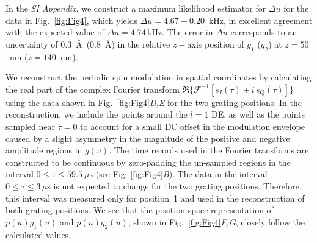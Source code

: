\documentclass[9pt,twocolumn,twoside,lineno]{pnas-new}
\begin{document}
In the \textit{SI Appendix}, we construct a maximum likelihood estimator for $\Delta u$ for the data in Fig.~\ref{fig:Fig4}, which yields $\Delta u = 4.67\pm 0.20$~kHz, in excellent agreement with the expected value of $\Delta u=4.74\,\text{kHz}$. The error in $\Delta u$ corresponds to an uncertainty of 0.3~\AA~(0.8~\AA) in the relative $z-$axis position of $g_1$ ($g_2$) at $z = 50$~nm ($z = 140$~nm).

We reconstruct the periodic spin modulation in spatial coordinates by calculating the real part of the complex Fourier transform $\Re\{\mathcal{F}^{-1}[s_I(\tau)+i\,s_Q(\tau)]\}$ using the data shown in Fig.~\ref{fig:Fig4}\textit{D,E} for the two grating positions. In the reconstruction, we include the points around the $l=1$ DE, as well as the points sampled near $\tau=0$ to account for a small DC offset in the modulation envelope caused by a slight asymmetry in the magnitude of the positive and negative amplitude regions in $g(u)$. The time records used in the Fourier transforms are constructed to be continuous by zero-padding the un-sampled regions in the interval $0\leq\tau\leq 59.5~\mu\text{s}$ (see Fig. \ref{fig:Fig4}\textit{B}). The data in the interval $0\leq\tau\leq 3\,\mu\text{s}$ is not expected to change for the two grating positions. Therefore, this interval was measured only for position~1 and used in the reconstruction of both grating positions. 
We see that the position-space representation of $p(u)g_1(u)$ and $p(u)g_2(u)$, shown in Fig.~\ref{fig:Fig4}\textit{F,G}, closely follow the calculated values.
\end{document}
